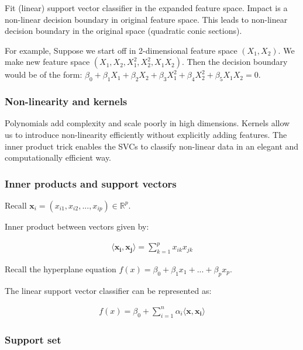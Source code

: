 Fit (linear) support vector classifier in the expanded feature space. Impact is a non-linear decision boundary in original feature space. This leads to non-linear decision boundary in the original space (quadratic conic sections).

For example, Suppose we start off in 2-dimensional feature space $(X_1,X_2)$. We make new feature space $(X_1,X_2,X_1^2,X_2^2,X_1X_2)$. Then the decision boundary would be of the form: $\beta_0+\beta_1X_1+\beta_2X_2+\beta_3X_1^2+\beta_4X_2^2+\beta_5X_1X_2 = 0$.

\subsubsection{Non-linearity and kernels}

\indent 

Polynomials add complexity and scale poorly in high dimensions. Kernels allow us to introduce non-linearity efficiently without explicitly adding features. The inner product trick enables the SVCs to classify non-linear data in an elegant and computationally efficient way.

\subsubsection{Inner products and support vectors}

\indent 

Recall $\boldsymbol{x}_i = (x_{i1},x_{i2},...,x_{ip})\in\mathbb{R}^p$.

Inner product between vectors given by:

\begin{align*}
    \langle \boldsymbol{x_i},\boldsymbol{x_j}\rangle = \sum_{k=1}^px_{ik}x_{jk}
\end{align*}

Recall the hyperplane equation $f(x) = \beta_0+\beta_1x_1+...+\beta_px_p$.

The linear support vector classifier can be represented as:

\begin{align*}
    f(x) = \beta_0+\sum_{i=1}^n \alpha_i\langle \boldsymbol{x},\boldsymbol{x_i}\rangle
\end{align*}

\subsubsection{Support set}

\indent 

